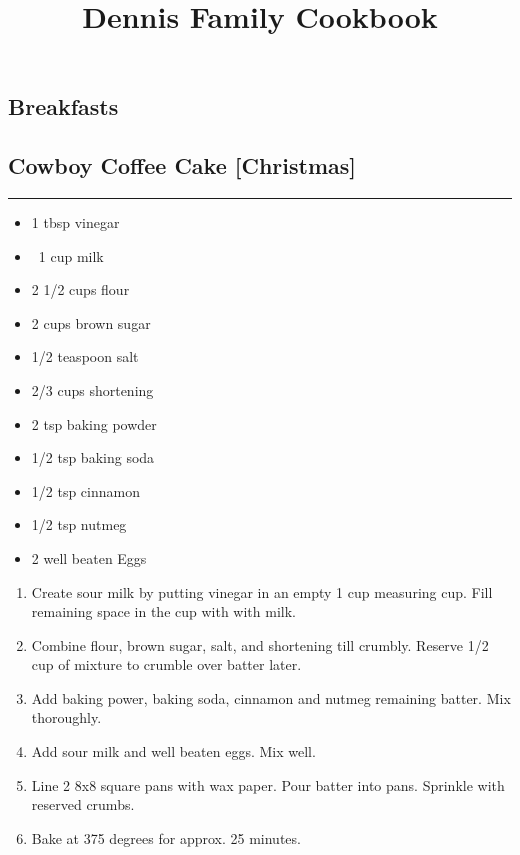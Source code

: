 \documentclass{article}
\title{Dennis Family Cookbook}
\date{}
\begin{document}
\maketitle
\tableofcontents
\newpage

\vspace*{\fill}
\begin{center}
    \section{Breakfasts}
\end{center}
\vspace*{\fill}
\newpage 

\subsection{Cowboy Coffee Cake [Christmas]} 
\noindent\rule[0.5ex]{\linewidth}{1pt}

\begin{framed}
    \begin{itemize}
        \item 1 tbsp vinegar 
        \item ~1 cup milk
        \item 2 1/2 cups flour
        \item 2 cups brown sugar 
        \item 1/2 teaspoon salt 
        \item 2/3 cups shortening
        \item 2 tsp baking powder
        \item 1/2 tsp baking soda 
        \item 1/2 tsp cinnamon  
        \item 1/2 tsp nutmeg 
        \item 2 well beaten Eggs
    \end{itemize}
\end{framed}

\begin{enumerate}
    \item 
        Create sour milk by putting vinegar in an empty 1 cup measuring cup. Fill remaining space in the cup with with milk.
    \item 
        Combine flour, brown sugar, salt, and shortening till crumbly. Reserve 1/2 cup of mixture to crumble over batter later.
    \item 
        Add baking power, baking soda, cinnamon and nutmeg remaining batter. Mix thoroughly.
    \item 
        Add sour milk and well beaten eggs. Mix well.
    \item 
        Line 2 8x8 square pans with wax paper. Pour batter into pans. Sprinkle with reserved crumbs.
    \item 
        Bake at 375 degrees for approx. 25 minutes.
\end{enumerate}
\newpage
\end{document}
